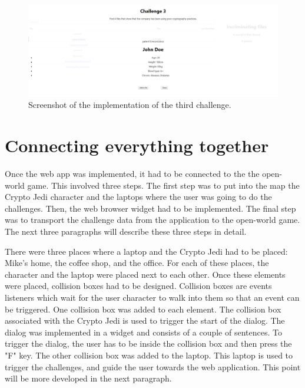 \documentclass{l4proj}
\begin{document}
\begin{figure}[b]
    \centering
    \includegraphics[width=\textwidth, frame]{images/Challenge3Imp.PNG}
    \caption{Screenshot of the implementation of the third challenge.}
    \label{fig:Challenge3Imp}
\end{figure}

\section{Connecting everything together}

Once the web app was implemented, it had to be connected to the the open-world game.
This involved three steps. The first step was to put into the map the Crypto Jedi character and the laptops 
where the user was going to do the challenges. Then, the web browser widget had to be implemented. 
The final step was to transport the challenge data from the application to the open-world game.
The next three paragraphs will describe these three steps in detail.

There were three places where a laptop and the Crypto Jedi had to be placed: Mike's home, the coffee shop, and the office.
For each of these places, the character and the laptop were placed next to each other.
Once these elements were placed, collision boxes had to be designed.
Collision boxes are events listeners which wait for the user character to walk into them so that an event can be triggered.
One collision box was added to each element. 
The collision box associated with the Crypto Jedi is used to trigger the start of the dialog.
The dialog was implemented in a widget and consists of a couple of sentences.
To trigger the dialog, the user has to be inside the collision box and then press the "F" key.
The other collision box was added to the laptop. 
This laptop is used to trigger the challenges, and guide the user towards the web application.
This point will be more developed in the next paragraph.
\end{document}

